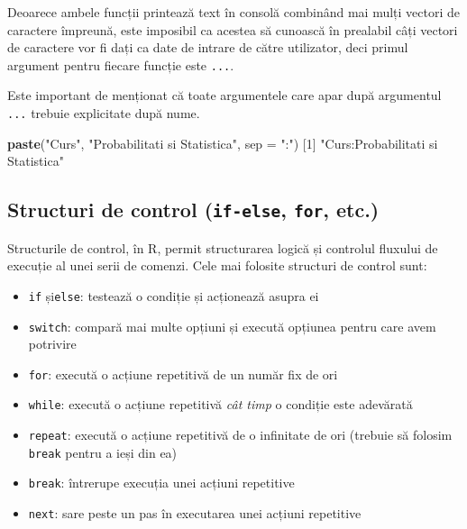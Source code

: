 \documentclass[]{article}
\newenvironment{Shaded}{\begin{snugshade}}{\end{snugshade}}
\newcommand{\KeywordTok}[1]{\textcolor[rgb]{0.13,0.29,0.53}{\textbf{#1}}}
\newcommand{\DataTypeTok}[1]{\textcolor[rgb]{0.13,0.29,0.53}{#1}}
\newcommand{\DecValTok}[1]{\textcolor[rgb]{0.00,0.00,0.81}{#1}}
\newcommand{\StringTok}[1]{\textcolor[rgb]{0.31,0.60,0.02}{#1}}
\newcommand{\NormalTok}[1]{#1}
\newcounter{exo}[section]
\begin{document}
Deoarece ambele funcții printează text în consolă combinând mai mulți
vectori de caractere împreună, este imposibil ca acestea să cunoască în
prealabil câți vectori de caractere vor fi dați ca date de intrare de
către utilizator, deci primul argument pentru fiecare funcție este
\texttt{...}.

Este important de menționat că toate argumentele care apar după
argumentul \texttt{...} trebuie explicitate după nume.

\begin{Shaded}
\begin{Highlighting}[]
\KeywordTok{paste}\NormalTok{(}\StringTok{"Curs"}\NormalTok{, }\StringTok{"Probabilitati si Statistica"}\NormalTok{, }\DataTypeTok{sep =} \StringTok{":"}\NormalTok{)}
\NormalTok{[}\DecValTok{1}\NormalTok{] }\StringTok{"Curs:Probabilitati si Statistica"}
\end{Highlighting}
\end{Shaded}

\subsection{\texorpdfstring{Structuri de control (\texttt{if-else},
\texttt{for},
etc.)}{Structuri de control (if-else, for, etc.)}}\label{structuri-de-control-if-else-for-etc.}

Structurile de control, în R, permit structurarea logică și controlul
fluxului de execuție al unei serii de comenzi. Cele mai folosite
structuri de control sunt:

\begin{itemize}
\item
  \texttt{if} și\texttt{else}: testează o condiție și acționează asupra
  ei
\item
  \texttt{switch}: compară mai multe opțiuni și execută opțiunea pentru
  care avem potrivire
\item
  \texttt{for}: execută o acțiune repetitivă de un număr fix de ori
\item
  \texttt{while}: execută o acțiune repetitivă \emph{cât timp} o
  condiție este adevărată
\item
  \texttt{repeat}: execută o acțiune repetitivă de o infinitate de ori
  (trebuie să folosim \texttt{break} pentru a ieși din ea)
\item
  \texttt{break}: întrerupe execuția unei acțiuni repetitive
\item
  \texttt{next}: sare peste un pas în executarea unei acțiuni repetitive
\end{itemize}
\end{document}

